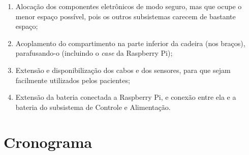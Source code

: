 \begin{enumerate}
    \item Alocação dos componentes eletrônicos de modo seguro, mas que ocupe
        o menor espaço possível, pois os outros subsistemas carecem de bastante
        espaço;
    \item Acoplamento do compartimento na parte inferior da cadeira (nos braços),
        parafusando-o (incluindo o \textit{case} da Raspberry Pi);
    \item Extensão e disponibilização dos cabos e dos sensores, para que sejam
        facilmente utilizados pelos pacientes;
    \item Extensão da bateria conectada a Raspberry Pi, e conexão entre ela e a
        bateria do subsistema de Controle e Alimentação.
\end{enumerate}

\section{Cronograma}

\begin{table}[!htbp]
    \centering
    \caption{Cronograma para a integração dos subsistemas.}
    \label{tab:cronogramaintegracao}
\end{table}
